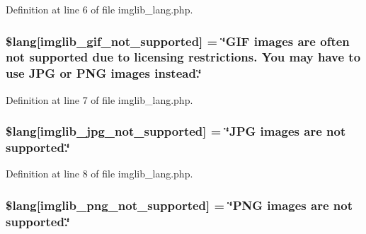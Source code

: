 Definition at line 6 of file imglib\+\_\+lang.\+php.

\subsubsection[{\texorpdfstring{\$lang}{$lang}}]{\setlength{\rightskip}{0pt plus 5cm}\$lang\mbox{[}\textquotesingle{}imglib\+\_\+gif\+\_\+not\+\_\+supported\textquotesingle{}\mbox{]} = \char`\"{}G\+IF images are often not supported due to licensing restrictions. You may have to use J\+PG or P\+NG images instead.\char`\"{}}\hypertarget{system_2language_2english_2imglib__lang_8php_a235a59a6660145fc136b3933b5b10675}{}\label{system_2language_2english_2imglib__lang_8php_a235a59a6660145fc136b3933b5b10675}


Definition at line 7 of file imglib\+\_\+lang.\+php.

\subsubsection[{\texorpdfstring{\$lang}{$lang}}]{\setlength{\rightskip}{0pt plus 5cm}\$lang\mbox{[}\textquotesingle{}imglib\+\_\+jpg\+\_\+not\+\_\+supported\textquotesingle{}\mbox{]} = \char`\"{}J\+PG images are not supported.\char`\"{}}\hypertarget{system_2language_2english_2imglib__lang_8php_a4acdc927c172bab1370b2897c667c552}{}\label{system_2language_2english_2imglib__lang_8php_a4acdc927c172bab1370b2897c667c552}


Definition at line 8 of file imglib\+\_\+lang.\+php.

\subsubsection[{\texorpdfstring{\$lang}{$lang}}]{\setlength{\rightskip}{0pt plus 5cm}\$lang\mbox{[}\textquotesingle{}imglib\+\_\+png\+\_\+not\+\_\+supported\textquotesingle{}\mbox{]} = \char`\"{}P\+NG images are not supported.\char`\"{}}\hypertarget{system_2language_2english_2imglib__lang_8php_a0b7ea2e2fbd03eb72fe9d969adb643dd}{}\label{system_2language_2english_2imglib__lang_8php_a0b7ea2e2fbd03eb72fe9d969adb643dd}


